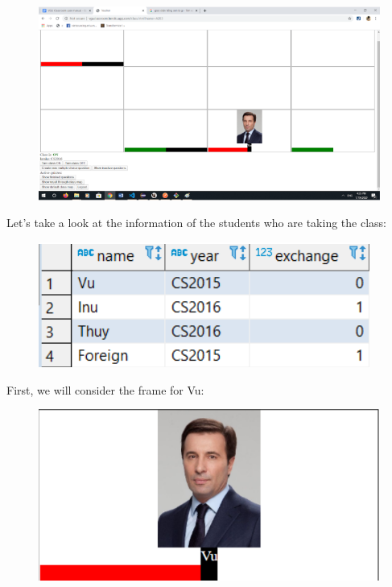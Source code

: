 \documentclass[a4paper, 11pt,openany]{book} %
\begin{document}
\begin{figure}[H]
    \centering
    \includegraphics[width=\textwidth,height=\textheight,keepaspectratio]{images/7.png}
\end{figure}
Let’s take a look at the information of the students who are taking the class:
\begin{figure}[H]
    \centering
    \includegraphics[width=\textwidth,height=\textheight,keepaspectratio]{images/8.png}
\end{figure}
First, we will consider the frame for Vu:
\begin{figure}[H]
    \centering
    \includegraphics[width=\textwidth,height=\textheight,keepaspectratio]{images/9.png}
\end{figure}
\end{document}
